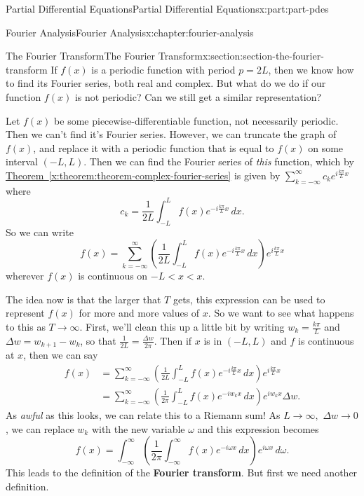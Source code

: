 \documentclass[twoside,10pt,]{book}
\newcommand{\xreffont}{\relax}
\newcommand{\terminology}[1]{\textbf{#1}}
\numberwithin{equation}{part}
\newcommand{\lt}{<}
\newcommand{\amp}{&}
\begin{document}
\begin{partptx}{Partial Differential Equations}{}{Partial Differential Equations}{}{}{x:part:part-pdes}
\begin{chapterptx}{Fourier Analysis}{}{Fourier Analysis}{}{}{x:chapter:fourier-analysis}
\begin{sectionptx}{The Fourier Transform}{}{The Fourier Transform}{}{}{x:section:section-the-fourier-transform}
If \(f(x)\) is a periodic function with period \(p=2L\), then we know how to find its Fourier series, both real and complex. But what do we do if our function \(f(x)\) is not periodic? Can we still get a similar representation?%
\par
Let \(f(x)\) be some piecewise-differentiable function, not necessarily periodic. Then we can't find it's Fourier series. However, we can truncate the graph of \(f(x)\), and replace it with a periodic function that is equal to \(f(x)\) on some interval \((-L,L)\). Then we can find the Fourier series of \emph{this} function, which by \hyperref[x:theorem:theorem-complex-fourier-series]{Theorem~{\xreffont\ref{x:theorem:theorem-complex-fourier-series}}} is given by \(\sum_{k=-\infty}^{\infty}c_{k}e^{i\frac{k\pi}{L}x}\) where%
\begin{equation*}
c_{k} = \frac{1}{2L}\int_{-L}^{L}f(x)e^{-i\frac{k\pi}{L}x}\,dx.
\end{equation*}
So we can write%
\begin{equation*}
f(x) = \sum_{k=-\infty}^{\infty}\left(\frac{1}{2L}\int_{-L}^{L}f(x)e^{-i\frac{k\pi}{L}x}\,dx\right)e^{i\frac{k\pi}{L}x}
\end{equation*}
wherever \(f(x)\) is continuous on \(-L \lt x \lt x\).%
\par
The idea now is that the larger that \(T\) gets, this expression can be used to represent \(f(x)\) for more and more values of \(x\). So we want to see what happens to this as \(T\to\infty\). First, we'll clean this up a little bit by writing \(w_{k} = \frac{k\pi}{L}\) and \(\Delta w = w_{k+1} - w_{k}\), so that \(\frac{1}{2L} = \frac{\Delta w}{2\pi}\). Then if \(x\) is in \((-L,L)\) and \(f\) is continuous at \(x\), then we can say%
\begin{align*}
f(x) \amp = \sum_{k=-\infty}^{\infty}\left(\frac{1}{2L}\int_{-L}^{L}f(x)e^{-i\frac{k\pi}{L}x}\,dx\right)e^{i\frac{k\pi}{L}x} \\
\amp = \sum_{k=-\infty}^{\infty}\left(\frac{1}{2\pi}\int_{-L}^{L}f(x)e^{-iw_{k}x}\,dx\right)e^{iw_{k}x}\Delta w. 
\end{align*}
As \emph{awful} as this looks, we can relate this to a Riemann sum! As \(L\to\infty,\) \(\Delta w\to0\), we can replace \(w_{k}\) with the new variable \(\omega\) and this expression becomes%
\begin{equation*}
f(x) = \int_{-\infty}^{\infty}\left(\frac{1}{2\pi}\int_{-\infty}^{\infty}f(x)e^{-i\omega x}\,dx\right)e^{i\omega x}\,d\omega.
\end{equation*}
This leads to the definition of the \terminology{Fourier transform}. But first we need another definition.%

\end{sectionptx}
\end{chapterptx}
\end{partptx}
\end{document}
